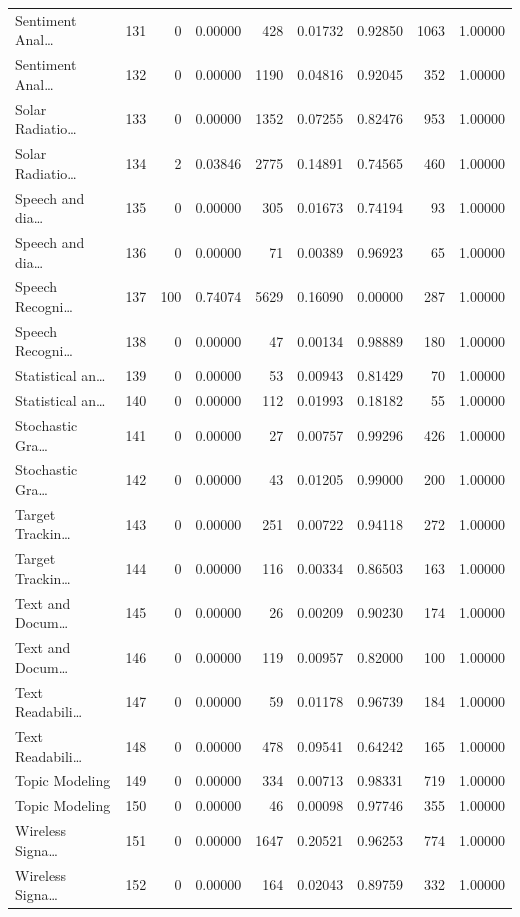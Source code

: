 \begin{table}
\begin{tabular}{lrrrrrrrr}
Sentiment Anal… & 131 & 0 & 0.00000 & 428 & 0.01732 & 0.92850 & 1063 & 1.00000 \\
Sentiment Anal… & 132 & 0 & 0.00000 & 1190 & 0.04816 & 0.92045 & 352 & 1.00000 \\
Solar Radiatio… & 133 & 0 & 0.00000 & 1352 & 0.07255 & 0.82476 & 953 & 1.00000 \\
Solar Radiatio… & 134 & 2 & 0.03846 & 2775 & 0.14891 & 0.74565 & 460 & 1.00000 \\
Speech and dia… & 135 & 0 & 0.00000 & 305 & 0.01673 & 0.74194 & 93 & 1.00000 \\
Speech and dia… & 136 & 0 & 0.00000 & 71 & 0.00389 & 0.96923 & 65 & 1.00000 \\
Speech Recogni… & 137 & 100 & 0.74074 & 5629 & 0.16090 & 0.00000 & 287 & 1.00000 \\
Speech Recogni… & 138 & 0 & 0.00000 & 47 & 0.00134 & 0.98889 & 180 & 1.00000 \\
Statistical an… & 139 & 0 & 0.00000 & 53 & 0.00943 & 0.81429 & 70 & 1.00000 \\
Statistical an… & 140 & 0 & 0.00000 & 112 & 0.01993 & 0.18182 & 55 & 1.00000 \\
Stochastic Gra… & 141 & 0 & 0.00000 & 27 & 0.00757 & 0.99296 & 426 & 1.00000 \\
Stochastic Gra… & 142 & 0 & 0.00000 & 43 & 0.01205 & 0.99000 & 200 & 1.00000 \\
Target Trackin… & 143 & 0 & 0.00000 & 251 & 0.00722 & 0.94118 & 272 & 1.00000 \\
Target Trackin… & 144 & 0 & 0.00000 & 116 & 0.00334 & 0.86503 & 163 & 1.00000 \\
Text and Docum… & 145 & 0 & 0.00000 & 26 & 0.00209 & 0.90230 & 174 & 1.00000 \\
Text and Docum… & 146 & 0 & 0.00000 & 119 & 0.00957 & 0.82000 & 100 & 1.00000 \\
Text Readabili… & 147 & 0 & 0.00000 & 59 & 0.01178 & 0.96739 & 184 & 1.00000 \\
Text Readabili… & 148 & 0 & 0.00000 & 478 & 0.09541 & 0.64242 & 165 & 1.00000 \\
Topic Modeling & 149 & 0 & 0.00000 & 334 & 0.00713 & 0.98331 & 719 & 1.00000 \\
Topic Modeling & 150 & 0 & 0.00000 & 46 & 0.00098 & 0.97746 & 355 & 1.00000 \\
Wireless Signa… & 151 & 0 & 0.00000 & 1647 & 0.20521 & 0.96253 & 774 & 1.00000 \\
Wireless Signa… & 152 & 0 & 0.00000 & 164 & 0.02043 & 0.89759 & 332 & 1.00000 \\
\bottomrule
\end{tabular}
\end{table}
